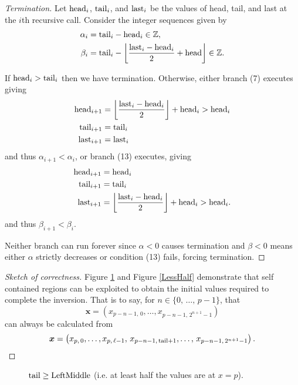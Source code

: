 \documentclass[12pt]{article}
\theoremstyle{definition}
\newcommand{\brac}[1]{\left( #1 \right)}
\newcommand{\xx}{\boldsymbol{x}}
\newcommand{\0}{\mathbf{0}}
\newcommand{\ZZ}{\mathbb{Z}}
\newcommand{\floor}[1]{\left\lfloor #1 \right\rfloor}
\theoremstyle{theorem}
\theoremstyle{definition}
\begin{document}
\begin{proof}[Termination]
Let $\text{head}_i$, $\text{tail}_i$, and $\text{last}_i$ be the values of head, tail, and last at the $i$th recursive call. Consider the {integer} sequences given by
\begin{align*}
\alpha_i &= \tail_i - \head_i \in \ZZ, \\ 
\beta_i &= \tail_i - \left\lfloor \dfrac{\last_i-\head_i}{2} + \head \right\rfloor \in \ZZ.
\end{align*}

If $\text{head}_i > \text{tail}_i$ then we have termination. Otherwise, either branch (7) executes giving
\begin{align*}
\head_{i+1} &= \floor{ \dfrac{\last_i - \head_i}{2} } + \head_i > \head_i\\
\tail_{i+1} &= \tail_i \\
\last_{i+1} &= \last_i
\end{align*}
and thus $\alpha_{i+1} < \alpha_i$, or branch (13) executes, giving
\begin{align*}
\head_{i+1} &= \head_i \\
\tail_{i+1} &= \tail_i \\
\last_{i+1} &= \floor{ \dfrac{\last_i - \head_i}{2} } + \head_i > \head_i .
\end{align*}
and thus $\beta_{i+1} < \beta_i$.

Neither branch can run forever since $\alpha<0$ causes termination and $\beta<0$ means either $\alpha$ strictly decreases or condition (13) fails, forcing termination.
\end{proof}

\begin{proof}[Sketch of correctness]
Figure \ref{MoreHalf} and Figure \ref{LessHalf} demonstrate that self contained regions can be exploited to obtain the  initial values required to complete the inversion. That is to say, for $n \in \{0,\, \ldots,\, p-1 \}$, that
$$
\xx = \brac{x_{p-n-1,\,0}, \ldots, x_{p-n-1,\,2^{n+1}-1} }
$$
can always be calculated from
$$
\xx = \brac{x_{p,\,0}, \ldots, x_{p,\,\ell-1} ,\, x_{p-n-1,\,{\rm tail}+1}, \ldots,\,  x_{p-n-1,\,2^{n+1}-1}}.
$$
\end{proof}

{\center
\begin{figure}[p]
\caption{$\text{tail} \geq {\rm LeftMiddle}$ (i.e. at least half the values are at $x=p$).}
\label{MoreHalf}
\end{figure}
}
\end{document}
